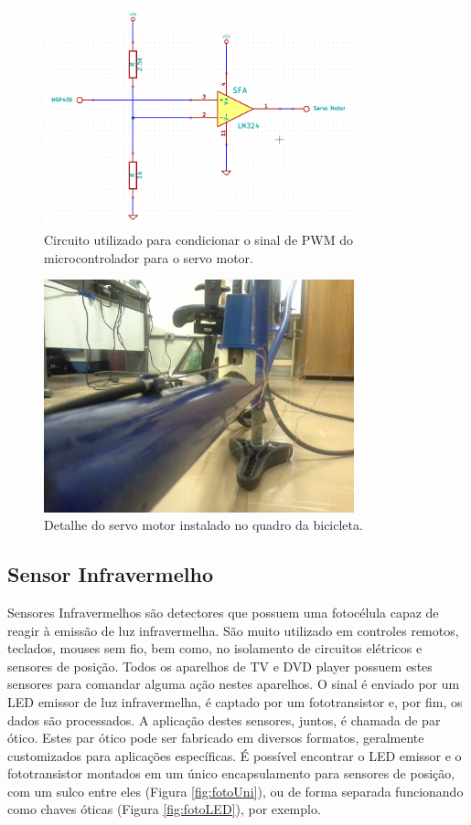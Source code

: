 \begin{figure}[h]
  \centering
	\includegraphics[width=0.8\textwidth]{figuras/circuitoPWM.png}
  \caption{Circuito utilizado para condicionar o sinal de PWM do microcontrolador para o servo motor.}
  \label{fig:circ_serv}
\end{figure}

\begin{figure}[h]
  \centering
	\includegraphics[width=0.8\textwidth]{figuras/servoQuadro.jpg}
  \caption{Detalhe do servo motor instalado no quadro da bicicleta.}
  \label{fig:foto_servo}
\end{figure}

\subsection{Sensor Infravermelho} %
\label{sub:sensor_infra}

Sensores Infravermelhos são detectores que possuem uma fotocélula capaz de reagir à emissão de luz infravermelha. São muito utilizado em controles remotos, teclados, mouses sem fio, bem como, no isolamento de circuitos elétricos e sensores de posição. Todos os aparelhos de TV e DVD player possuem estes sensores para comandar alguma ação nestes aparelhos. O sinal é enviado por um LED emissor de luz infravermelha, é captado por um fototransistor e, por fim, os dados são processados. 
A aplicação destes sensores, juntos, é chamada de par ótico. Estes par ótico pode ser fabricado em diversos formatos, geralmente customizados para aplicações específicas. É possível encontrar o LED emissor e o fototransistor montados em um único encapsulamento para sensores de posição, com um sulco entre eles (Figura \ref{fig:fotoUni}), ou de forma separada funcionando como chaves óticas (Figura \ref{fig:fotoLED}), por exemplo.

